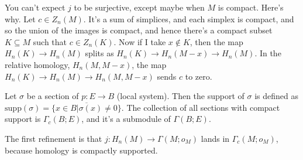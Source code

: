 You can't expect $j$ to be surjective, except maybe when $M$ is compact. Here's why. Let $c\in Z_n(M)$. It's a sum of simplices, and each simplex is compact, and so the union of the images is compact, and hence there's a compact subset $K\subseteq M$ such that $c\in Z_n(K)$. Now if I take $x\not\in K$, then the map $H_n(K)\to H_n(M)$ splits as $H_n(K)\to H_n(M-x)\to H_n(M)$. In the relative homology, $H_n(M,M-x)$, the map $H_n(K)\to H_n(M)\to H_n(M,M-x)$ sends $c$ to zero.
\begin{definition}
Let $\sigma$ be a section of $p:E\to B$ (local system). Then the support of $\sigma$ is defined as $\mathrm{supp}(\sigma)=\overline{\{x\in B|\sigma(x)\neq 0\}}$. The collection of all sections with compact support is $\Gamma_c(B;E)$, and it's a submodule of $\Gamma(B;E)$.
\end{definition}
The first refinement is that $j:H_n(M)\to \Gamma(M;o_M)$ lands in $\Gamma_c(M;o_M)$, because homology is compactly supported.


